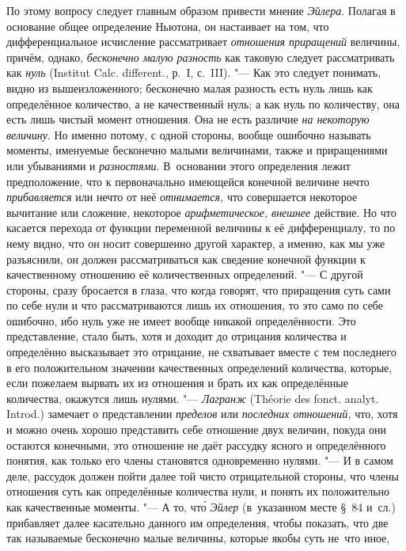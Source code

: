 По этому вопросу следует главным образом привести мнение {\em Эйлера}. Полагая
в основание общее определение Ньютона, он настаивает на том, что
дифференциальное исчисление рассматривает {\em отношения приращений}
величины, причём, однако, {\em бесконечно малую разность} как таковую следует
рассматривать как {\em нуль} (Ins\-ti\-tut Calc.
dif\-fe\-rent., р.~I, с.~III). "--- Как это следует понимать, видно из
вышеизложенного; бесконечно малая разность есть нуль лишь как определённое количество, а не
качественный нуль; а как нуль по количеству, она есть лишь чистый момент
отношения. Она не есть различие {\em на некоторую величину}. Но именно потому,
с одной стороны, вообще ошибочно называть моменты, именуемые бесконечно малыми
величинами, также и приращениями или убываниями и {\em разностями}. В~основании
этого определения лежит предположение, что к первоначально имеющейся конечной
величине нечто {\em прибавляется} или нечто от неё {\em отнимается,} что
совершается некоторое вычитание или сложение, некоторое {\em арифметическое,}
{\em внешнее} действие. Но что касается перехода от функции переменной величины
к её дифференциалу, то по нему видно, что он носит совершенно другой характер,
а именно, как мы уже разъяснили, он должен рассматриваться как сведение
конечной функции к качественному отношению её количественных определений. "---
С другой стороны, сразу бросается в глаза, что когда говорят, что приращения
суть сами по себе нули и что рассматриваются лишь их отношения, то это само по
себе ошибочно, ибо нуль уже не имеет вообще никакой определённости. Это
представление, стало быть, хотя и доходит до отрицания количества и определённо
высказывает это отрицание, не схватывает вместе с тем последнего в его
положительном значении качественных определений количества, которые, если
пожелаем вырвать их из отношения и брать их как определённые количества,
окажутся лишь нулями. "--- {\em Лагранж} (Théorie des fonct. analyt. Introd.)
замечает о представлении {\em пределов} или {\em последних отношений,} что,
хотя и можно очень хорошо представить себе отношение двух величин, покуда они
остаются конечными, это отношение не даёт рассудку ясного и определённого
понятия, как только его члены становятся одновременно нулями. "--- И в самом
деле, рассудок должен пойти далее той чисто отрицательной стороны, что члены
отношения суть как определённые количества нули, и понять их положительно как
качественные моменты. "--- А то, чт\'{о} {\em Эйлер} (в~указанном месте \S~84
и~сл.) прибавляет далее касательно данного им определения, чтобы показать, что
две так называемые бесконечно малые величины, которые якобы суть не~что иное,

